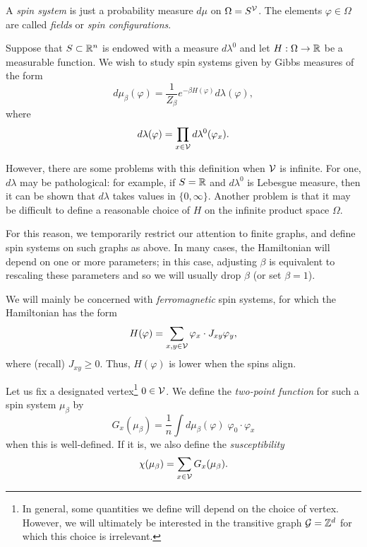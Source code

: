 A \emph{spin system} is just a probability measure $d\mu$ on $\Omega = S^{\mathcal{V}}$.
The elements $\varphi \in \Omega$ are called \emph{fields} or \emph{spin configurations}.

Suppose that $S \subset {\mathbb R}^n$ is endowed with a measure $d\lambda^0$ and let
$H : \Omega \rightarrow {\mathbb R}$ be a measurable function.
We wish to study spin systems given by Gibbs measures of the form
\begin{equation}
d\mu_\beta(\varphi) = \frac{1}{Z_\beta} e^{-\beta H(\varphi)} d\lambda(\varphi),
\end{equation}
where
\begin{equation}
d\lambda(\varphi) = \prod_{x\in\mathcal{V}} d\lambda^0(\varphi_x).
\end{equation}

However, there are some problems with this definition when $\mathcal{V}$ is infinite.
For one, $d\lambda$ may be pathological: for example, if $S = {\mathbb R}$ and $d\lambda^0$
is Lebesgue measure, then it can be shown that $d\lambda$ takes values in $\{0, \infty\}$.
Another problem is that it may be difficult to define a reasonable choice of $H$ on the
infinite product space $\Omega$.

For this reason, we temporarily restrict our attention to finite graphs, and define spin
systems on such graphs as above. In many cases, the Hamiltonian will depend on one or
more parameters; in this case, adjusting $\beta$ is equivalent to rescaling these parameters
and so we will usually drop $\beta$ (or set $\beta = 1$).

We will mainly be concerned with \emph{ferromagnetic} spin systems, for which the Hamiltonian
has the form
\begin{equation}
H(\varphi) = \sum_{x, y \in \mathcal{V}} \varphi_x \cdot J_{xy} \varphi_y,
\end{equation}
where (recall) $J_{xy} \ge 0$. Thus, $H(\varphi)$ is lower when the spins align.

Let us fix a designated vertex\footnote{In general, some quantities we define will depend
on the choice of vertex. However, we will ultimately be interested in the transitive graph
$\mathcal{G} = { {{\mathbb Z}}^d }$ for which this choice is irrelevant.} $0 \in \mathcal{V}$.
We define the \emph{two-point function} for such a spin system $\mu_\beta$ by
\begin{equation}
G_x(\mu_\beta) = \frac{1}{n} \int d\mu_\beta(\varphi) \; \varphi_0 \cdot \varphi_x
\end{equation}
when this is well-defined. If it is, we also define the \emph{susceptibility}
\begin{equation}
\chi(\mu_\beta) = \sum_{x\in\mathcal{V}} G_x(\mu_\beta).
\end{equation}

